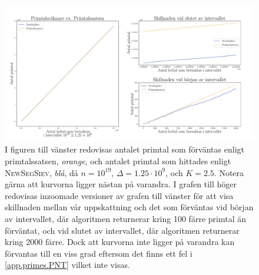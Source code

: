 \begin{figure}[h] %
    \centering
    \includegraphics[width = \textwidth]{coen/Images/Primes.pdf}
    \caption{I figuren till vänster redovisas antalet primtal som förväntas enligt primtalssatsen, \textit{orange}, och antalet primtal som hittades enligt \textsc{NewSegSiev}, \textit{blå}, då \(n = 10^{19}\), \(\Delta = 1.25\cdot10^{9}\), och \(K = 2.5\). 
    Notera gärna att kurvorna ligger nästan på varandra. 
    I grafen till höger redovisas inzoomade versioner av grafen till vänster för att visa skillnaden mellan vår uppskattning och det som förväntas vid början av intervallet, där algoritmen returnerar kring 100 färre primtal än förväntat, och vid slutet av intervallet, där algoritmen returnerar kring 2000 färre.
    Dock att kurvorna inte ligger på varandra kan förvantas till en viss grad eftersom det finns ett fel i \ref{app.primes.PNT} vilket inte visas.}
    \label{fig:res.prime}
\end{figure}

